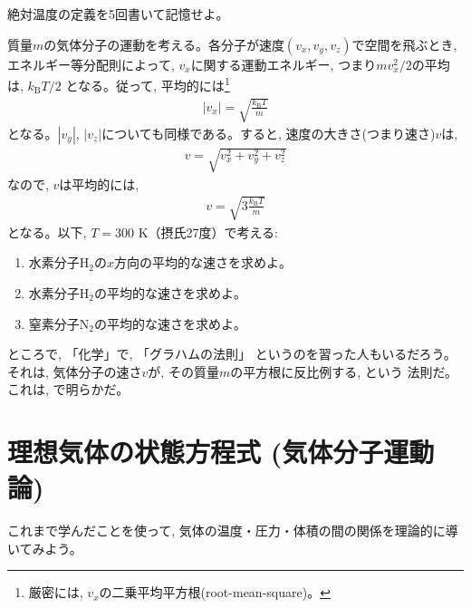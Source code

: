 \begin{q}\label{q:def_temperature}
絶対温度の定義を5回書いて記憶せよ。\end{q}\mv

\begin{q}\label{q:velocity_temperature}
質量$m$の気体分子の運動を考える。各分子が速度$(v_x, v_y, v_z)$で空間を飛ぶとき, 
エネルギー等分配則によって, $v_x$に関する運動エネルギー, つまり$mv_x^2/2$の平均は, $k_{\text{B}}T/2$
となる。従って, 平均的には\footnote{厳密には, $v_x$の二乗平均平方根(root-mean-square)。}
\begin{eqnarray}|v_x|=\sqrt{\frac{k_{\text{B}}T}{m}}\label{eq:velocity_temperature1}\end{eqnarray}
となる。$|v_y|$, $|v_z|$についても同様である。すると, 速度の大きさ(つまり速さ)$v$は, 
\begin{eqnarray}v=\sqrt{v_x^2+v_y^2+v_z^2}\label{eq:velocity_temperature2}\end{eqnarray}
なので, $v$は平均的には, 
\begin{eqnarray}v=\sqrt{3\frac{k_{\text{B}}T}{m}}\label{eq:velocity_temperature3}\end{eqnarray}
となる。以下, $T=300$ K（摂氏27度）で考える:
\begin{enumerate}
\item 水素分子H$_2$の$x$方向の平均的な速さを求めよ。
\item 水素分子H$_2$の平均的な速さを求めよ。
\item 窒素分子N$_2$の平均的な速さを求めよ。
\end{enumerate}
\end{q}

ところで, 「化学」で, 「グラハムの法則」
というのを習った人もいるだろう。それは, 気体分子の速さ$v$が, 
その質量$m$の平方根に反比例する, という
法則だ。これは, で明らかだ。
\vspace{0.6cm}


\section{理想気体の状態方程式 (気体分子運動論)}

これまで学んだことを使って, 気体の温度・圧力・体積の間の関係を理論的に導いてみよう。

